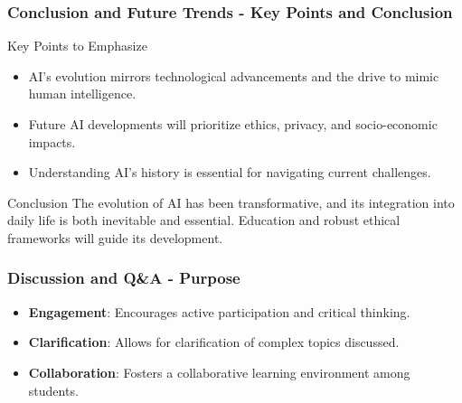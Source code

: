 \documentclass[aspectratio=169]{beamer}
\begin{document}
\begin{frame}[fragile]
    \frametitle{Conclusion and Future Trends - Key Points and Conclusion}
    \begin{block}{Key Points to Emphasize}
        \begin{itemize}
            \item AI's evolution mirrors technological advancements and the drive to mimic human intelligence.
            \item Future AI developments will prioritize ethics, privacy, and socio-economic impacts.
            \item Understanding AI's history is essential for navigating current challenges.
        \end{itemize}
    \end{block}

    \begin{block}{Conclusion}
        The evolution of AI has been transformative, and its integration into daily life is both inevitable and essential. Education and robust ethical frameworks will guide its development.
    \end{block}
\end{frame}

\begin{frame}[fragile]
  \frametitle{Discussion and Q\&A - Purpose}
  \begin{itemize}
    \item \textbf{Engagement}: Encourages active participation and critical thinking.
    \item \textbf{Clarification}: Allows for clarification of complex topics discussed.
    \item \textbf{Collaboration}: Fosters a collaborative learning environment among students.
  \end{itemize}
\end{frame}
\end{document}
